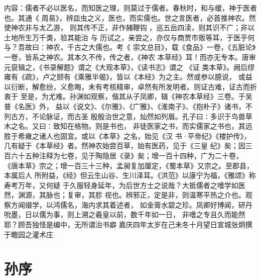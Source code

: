 \documentclass[12pt,UTF8]{ctexbook}
\begin{document}
内容：儒者不必以医名，而知医之理，则莫过于儒者。春秋时，和与缓，神于医者也。其通《 
周易》，辨皿虫之义，医也，而实儒也。世之言医者，必首推神农。然使神农非与太乙游， 
则其传不正，非作赭鞭钩 ，巡五岳四渎，则其识不广；非以土地所生万千类，验其能治 
与 
历试之，亲尝之，亦仅与商贾市贩等耳，于医乎何与？吾故曰∶神农，千古之大儒也。考《 
崇文总目》，载《食品》一卷，《五脏论》一卷，皆系之神农。其本久不传，传之者，《神农 
本草经》耳！而亦无专本。唐审元裒辑之，《书录解题》谓之《大观本草》，《读书志》谓之 
《证 
类本草》。阙后缪雍有《疏》，卢之颐有《乘雅半偈》，皆以《本经》为之主。然或参以臆说， 
或益以衍断，解愈纷，义愈晦，未有考核精审，卓然有所发明者。则证古难，证古而折衷于 
至是，为尤难。孙渊如观察，偕其从子凤卿，辑《神农本草经》三卷。于吴普《名医》外， 
益以《说文》、《尔雅》、《广雅》、《淮南子》、《抱朴子》诸书，不列古方，不论脉证，而古圣 
殷殷治世之意，灿然如列眉。孔子曰∶多识于鸟兽草木之名。又曰∶致知在格物。则是书也， 
非徒医家之书，而实儒家之书也，其远胜于希雍之诸人也固宜。或以《本草》之名，始见《汉 
书·平帝纪》《楼护传》，几有疑于《本草经》者。然神农始尝百草，始有医药，见于《三皇 
纪》矣；因三百六十五种注释为七卷，见于陶隐居《录》矣；增一百十四种，广为二十卷， 
《唐本草》宗之；增一百三十三种，孟昶复加厘定，《蜀本草》又宗之。至郡县，本属后人 
所附益，《经》但云生山谷、生川泽耳。《洪范》以康宁为福，《雅颂》称寿考万年，又何疑 
于久服轻身延年，为后世方士之说哉？大抵儒者之嗜学如医然，渊源，其脉也；复审，其胗 
视也。辨邪正，定是非，则温寒平热之介也。观察方闻缀学，以鸿儒名，海内求其着述者， 
如金膏水碧之珍。凤卿好博闻，研丹吮墨，日以儒为事，则上溯之羲皇以前，数千年如一日， 
非嗜之专且久而能然耶？顾吾独怪是编中，无所谓治书癖 
嘉庆四年太岁在己未冬十月望日宣城张炯撰于瞻园之灌术庄

\chapter{孙序}
\end{document}
